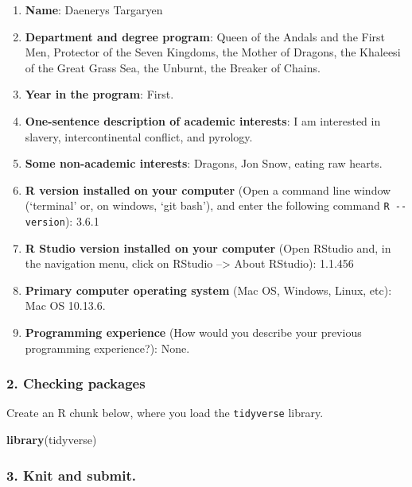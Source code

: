 \documentclass[]{book}
\newenvironment{Shaded}{\begin{snugshade}}{\end{snugshade}}
\newcommand{\KeywordTok}[1]{\textcolor[rgb]{0.13,0.29,0.53}{\textbf{#1}}}
\newcommand{\NormalTok}[1]{#1}
\providecommand{\tightlist}{%
  \setlength{\itemsep}{0pt}\setlength{\parskip}{0pt}}
\begin{document}
\begin{enumerate}
\def\labelenumi{\arabic{enumi}.}
\tightlist
\item
  \textbf{Name}: Daenerys Targaryen
\item
  \textbf{Department and degree program}: Queen of the Andals and the First Men, Protector of the Seven Kingdoms, the Mother of Dragons, the Khaleesi of the Great Grass Sea, the Unburnt, the Breaker of Chains.
\item
  \textbf{Year in the program}: First.
\item
  \textbf{One-sentence description of academic interests}: I am interested in slavery, intercontinental conflict, and pyrology.
\item
  \textbf{Some non-academic interests}: Dragons, Jon Snow, eating raw hearts.
\item
  \textbf{R version installed on your computer} (Open a command line window (`terminal' or, on windows, `git bash'), and enter the following command \texttt{R\ -\/-version}): 3.6.1
\item
  \textbf{R Studio version installed on your computer} (Open RStudio and, in the navigation menu, click on RStudio --\textgreater{} About RStudio): 1.1.456
\item
  \textbf{Primary computer operating system} (Mac OS, Windows, Linux, etc): Mac OS 10.13.6.
\item
  \textbf{Programming experience} (How would you describe your previous programming experience?): None.
\end{enumerate}

\hypertarget{checking-packages}{%
\subsubsection*{2. Checking packages}\label{checking-packages}}

Create an R chunk below, where you load the \texttt{tidyverse} library.

\begin{Shaded}
\begin{Highlighting}[]
\KeywordTok{library}\NormalTok{(tidyverse)}
\end{Highlighting}
\end{Shaded}

\hypertarget{knit-and-submit.}{%
\subsubsection*{3. Knit and submit.}\label{knit-and-submit.}}
\end{document}
